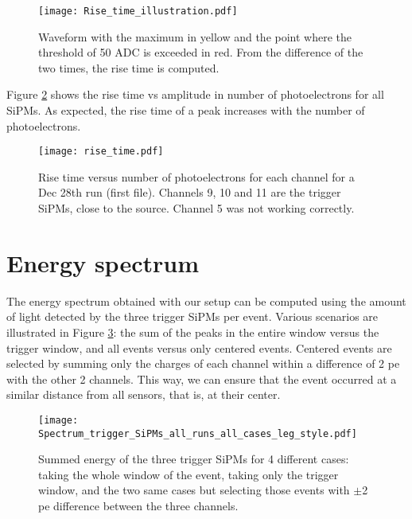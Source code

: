 \documentclass[11pt,a4paper,english,oneside, pdf]{article}
\begin{document}
	\begin{figure}[!h]
		\begin{center}
			\texttt{[image: Rise\_time\_illustration.pdf]}
			\caption{Waveform with the maximum in yellow and the point where the threshold of 50 ADC is exceeded in red. From the difference of the two times, the rise time is computed.}
			\label{fig:Rise_time_illustration}
		\end{center}
	\end{figure}
	
	Figure \ref{fig:rise_time} shows the rise time vs amplitude in number of photoelectrons for all SiPMs. As expected, the rise time of a peak increases with the number of photoelectrons.
	
	\begin{figure}[!h]
		\begin{center}
			\texttt{[image: rise\_time.pdf]}
			\caption{Rise time versus number of photoelectrons for each channel for a Dec 28th run (first file). Channels 9, 10 and 11 are the trigger SiPMs, close to the source. Channel 5 was not working correctly.}
			\label{fig:rise_time}
		\end{center}
	\end{figure}
	
	
	\clearpage
	
	\section{Energy spectrum}
	
	The energy spectrum obtained with our setup can be computed using the amount of light detected by the three trigger SiPMs per event. Various scenarios are illustrated in Figure \ref{fig:Spectrum_trigger_SiPMs_all_runs_all_cases}: the sum of the peaks in the entire window versus the trigger window, and all events versus only centered events. Centered events are selected by summing only the charges of each channel within a difference of 2 pe with the other 2 channels. This way, we can ensure that the event occurred at a similar distance from all sensors, that is, at their center.
	
	\begin{figure}[!h]
		\begin{center}
			\texttt{[image: Spectrum\_trigger\_SiPMs\_all\_runs\_all\_cases\_leg\_style.pdf]}
			\caption{Summed energy of the three trigger SiPMs for 4 different cases: taking the whole window of the event, taking only the trigger window, and the two same cases but selecting those events with $\pm$2 pe difference between the three channels.}
			\label{fig:Spectrum_trigger_SiPMs_all_runs_all_cases}
		\end{center}
	\end{figure}
	
\end{document}
